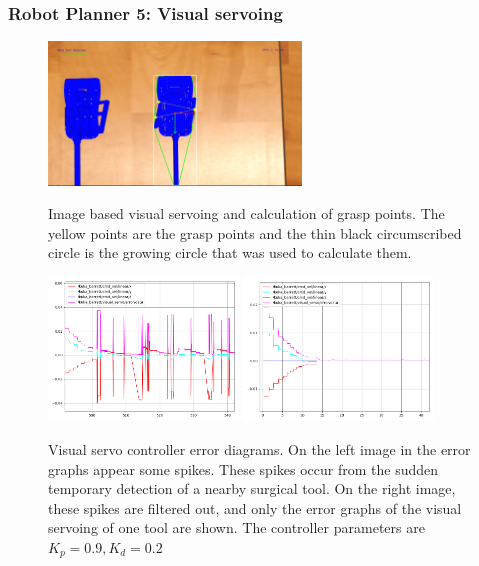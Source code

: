 \begin{frame}
\frametitle{Robot Planner 5: Visual servoing}
\begin{center}
\begin{figure}[!htb]
\centering
\includegraphics[width=0.6\textwidth]{../images/grasp-points-triangle.png}\\
\caption{Image based visual servoing and calculation of grasp points. The yellow points are the grasp points and the thin black circumscribed circle is the growing circle that was used to calculate them.}
\end{figure}
\end{center}
\end{frame}

\begin{frame}
\begin{center}
\begin{figure}[!htb]
\centering
\includegraphics[width=0.45\textwidth]{../images/robot_planner5/visual_servo_controller3.png}
\includegraphics[width=0.45\textwidth]{../images/robot_planner5/visual_servo_controller4.png}\\
\caption{Visual servo controller error diagrams. On the left image in the error graphs appear some spikes. These spikes occur from the sudden temporary detection 
of a nearby surgical tool. On the right image, these spikes are filtered out, and only the error graphs of the visual servoing of one tool are shown. The  
controller parameters are $K_p = 0.9, K_d = 0.2$}
\end{figure}
\end{center}
\end{frame}

